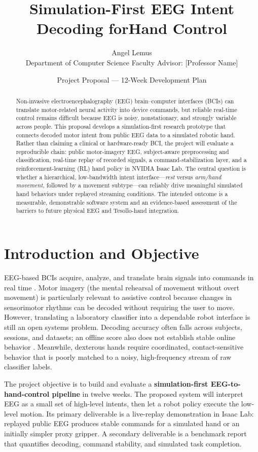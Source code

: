 \documentclass[11pt]{article}
\title{Simulation-First EEG Intent Decoding for\Robotic Hand Control}
\author{Angel Lemus \\ \small Department of Computer Science \quad \textbar\quad \small Faculty Advisor: [Professor Name]}
\date{Project Proposal --- 12-Week Development Plan}
\begin{document}
\maketitle
\vspace{-1.1em}

\begin{abstract}
Non-invasive electroencephalography (EEG) brain--computer interfaces (BCIs) can translate motor-related neural activity into device commands, but reliable real-time control remains difficult because EEG is noisy, nonstationary, and strongly variable across people. This proposal develops a simulation-first research prototype that connects decoded motor intent from public EEG data to a simulated robotic hand. Rather than claiming a clinical or hardware-ready BCI, the project will evaluate a reproducible chain: public motor-imagery EEG, subject-aware preprocessing and classification, real-time replay of recorded signals, a command-stabilization layer, and a reinforcement-learning (RL) hand policy in NVIDIA Isaac Lab. The central question is whether a hierarchical, low-bandwidth intent interface---\emph{rest} versus \emph{arm/hand movement}, followed by a movement subtype---can reliably drive meaningful simulated hand behaviors under replayed streaming conditions. The intended outcome is a measurable, demonstrable software system and an evidence-based assessment of the barriers to future physical EEG and Tesollo-hand integration.
\end{abstract}

\section{Introduction and Objective}
EEG-based BCIs acquire, analyze, and translate brain signals into commands in real time \citep{mcfarland2017}. Motor imagery (the mental rehearsal of movement without overt movement) is particularly relevant to assistive control because changes in sensorimotor rhythms can be decoded without requiring the user to move. However, translating a laboratory classifier into a dependable robot interface is still an open systems problem. Decoding accuracy often falls across subjects, sessions, and datasets; an offline score also does not establish stable online behavior \citep{lotte2018,jeuneet2018}. Meanwhile, dexterous hands require coordinated, contact-sensitive behavior that is poorly matched to a noisy, high-frequency stream of raw classifier labels.

The project objective is to build and evaluate a \textbf{simulation-first EEG-to-hand-control pipeline} in twelve weeks. The proposed system will interpret EEG as a small set of high-level intents, then let a robot policy execute the low-level motion. Its primary deliverable is a live-replay demonstration in Isaac Lab: replayed public EEG produces stable commands for a simulated hand or an initially simpler proxy gripper. A secondary deliverable is a benchmark report that quantifies decoding, command stability, and simulated task completion.
\end{document}
